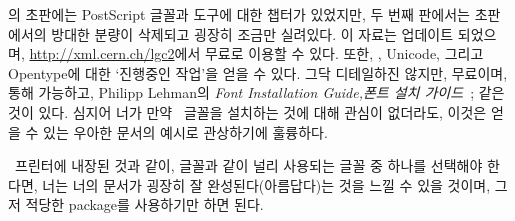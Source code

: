 
의 초판에는 PostScript 글꼴과 도구에 대한 챕터가 있었지만, 두 번째 판에서는 초판에서의 방대한 분량이 삭제되고 굉장히 조금만 실려있다.
이 자료는 업데이트 되었으며, \url{http://xml.cern.ch/lgc2}에서 무료로 이용할 수 있다. 또한, \pixxetx, Unicode, 그리고
Opentype에 대한 
`진행중인 작업'을 얻을 수 있다.
그닥 디테일하진 않지만, 무료이며,  통해 가능하고, Philipp Lehman의 \textit{Font Installation Guide,폰트 설치 가이드}~\cite{FONTINST}; 같은 것이 있다.
심지어 너가 만약 \pscript\ 글꼴을 설치하는 것에 대해 관심이 없더라도, 이것은  얻을 수 있는 우아한 문서의 예시로 관상하기에 훌륭하다.

\ixpscript\ 프린터에 내장된 것과 같이, \pscript{} 글꼴과 같이 널리 사용되는 글꼴 중 하나를 선택해야 한다면, 
너는 너의 문서가 굉장히 잘 완성된다(아름답다)는 것을 느낄 수 있을 것이며, 그저 적당한 package를 사용하기만 하면 된다.

